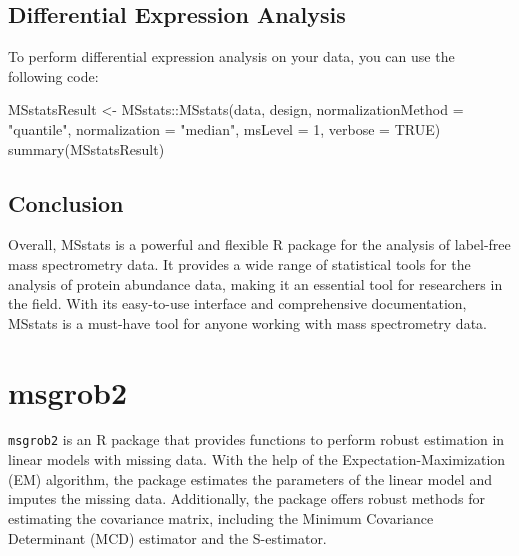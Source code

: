 \documentclass[
]{book}
\newenvironment{Shaded}{\begin{snugshade}}{\end{snugshade}}
\newcommand{\AttributeTok}[1]{\textcolor[rgb]{0.77,0.63,0.00}{#1}}
\newcommand{\ConstantTok}[1]{\textcolor[rgb]{0.00,0.00,0.00}{#1}}
\newcommand{\DecValTok}[1]{\textcolor[rgb]{0.00,0.00,0.81}{#1}}
\newcommand{\FunctionTok}[1]{\textcolor[rgb]{0.00,0.00,0.00}{#1}}
\newcommand{\NormalTok}[1]{#1}
\newcommand{\OtherTok}[1]{\textcolor[rgb]{0.56,0.35,0.01}{#1}}
\newcommand{\SpecialCharTok}[1]{\textcolor[rgb]{0.00,0.00,0.00}{#1}}
\newcommand{\StringTok}[1]{\textcolor[rgb]{0.31,0.60,0.02}{#1}}
\begin{document}
\hypertarget{differential-expression-analysis}{%
\subsection{Differential Expression Analysis}\label{differential-expression-analysis}}

To perform differential expression analysis on your data, you can use the following code:

\begin{Shaded}
\begin{Highlighting}[]
\NormalTok{MSstatsResult }\OtherTok{\textless{}{-}}\NormalTok{ MSstats}\SpecialCharTok{::}\FunctionTok{MSstats}\NormalTok{(data, design,}
                                  \AttributeTok{normalizationMethod =} \StringTok{"quantile"}\NormalTok{,}
                                  \AttributeTok{normalization =} \StringTok{"median"}\NormalTok{,}
                                  \AttributeTok{msLevel =} \DecValTok{1}\NormalTok{, }\AttributeTok{verbose =} \ConstantTok{TRUE}\NormalTok{)}
\FunctionTok{summary}\NormalTok{(MSstatsResult)}
\end{Highlighting}
\end{Shaded}

\hypertarget{conclusion}{%
\subsection{Conclusion}\label{conclusion}}

Overall, MSstats is a powerful and flexible R package for the analysis of label-free mass spectrometry data. It provides a wide range of statistical tools for the analysis of protein abundance data, making it an essential tool for researchers in the field. With its easy-to-use interface and comprehensive documentation, MSstats is a must-have tool for anyone working with mass spectrometry data.

\hypertarget{msgrob2}{%
\section{msgrob2}\label{msgrob2}}

\texttt{msgrob2} is an R package that provides functions to perform robust estimation in linear models with missing data. With the help of the Expectation-Maximization (EM) algorithm, the package estimates the parameters of the linear model and imputes the missing data. Additionally, the package offers robust methods for estimating the covariance matrix, including the Minimum Covariance Determinant (MCD) estimator and the S-estimator.
\end{document}
